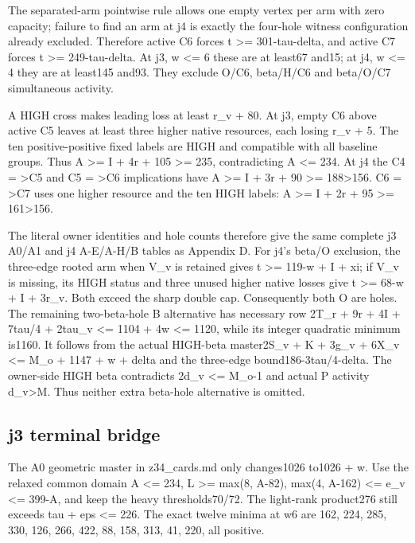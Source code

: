 \documentclass[11pt,a4paper]{article}
\begin{document}
The separated-arm pointwise rule allows one empty vertex per arm with
zero capacity; failure to find an arm at j4 is exactly the four-hole
witness configuration already excluded. Therefore active C6 forces t
\textgreater= 301-tau-delta, and active C7 forces t \textgreater=
249-tau-delta. At j3, w \textless= 6 these are at least67 and15; at j4,
w \textless= 4 they are at least145 and93. They exclude O/C6, beta/H/C6
and beta/O/C7 simultaneous activity.

A HIGH cross makes leading loss at least r\_v + 80. At j3, empty C6
above active C5 leaves at least three higher native resources, each
losing r\_v + 5. The ten positive-positive fixed labels are HIGH and
compatible with all baseline groups. Thus A \textgreater= I + 4r + 105
\textgreater= 235, contradicting A \textless= 234. At j4 the C4 =
\textgreater C5 and C5 = \textgreater C6 implications have A
\textgreater= I + 3r + 90 \textgreater= 188\textgreater156. C6 =
\textgreater C7 uses one higher resource and the ten HIGH labels: A
\textgreater= I + 2r + 95 \textgreater= 161\textgreater156.

The literal owner identities and hole counts therefore give the same
complete j3 A0/A1 and j4 A-E/A-H/B tables as Appendix D. For j4's beta/O
exclusion, the three-edge rooted arm when V\_v is retained gives t
\textgreater= 119-w + I + xi; if V\_v is missing, its HIGH status and
three unused higher native losses give t \textgreater= 68-w + I + 3r\_v.
Both exceed the sharp double cap. Consequently both O are holes. The
remaining two-beta-hole B alternative has necessary row 2T\_r + 9r + 4I
+ 7tau/4 + 2tau\_v \textless= 1104 + 4w \textless= 1120, while its
integer quadratic minimum is1160. It follows from the actual HIGH-beta
master2S\_v + K + 3g\_v + 6X\_v \textless= M\_o + 1147 + w + delta and
the three-edge bound186-3tau/4-delta. The owner-side HIGH beta
contradicts 2d\_v \textless= M\_o-1 and actual P activity
d\_v\textgreater M. Thus neither extra beta-hole alternative is omitted.

\hypertarget{j3-terminal-bridge}{%
\subsection{j3 terminal bridge}\label{j3-terminal-bridge}}

The A0 geometric master in z34\_cards.md only changes1026 to1026 + w.
Use the relaxed common domain A \textless= 234, L \textgreater= max(8,
A-82), max(4, A-162) \textless= e\_v \textless= 399-A, and keep the
heavy thresholds70/72. The light-rank product276 still exceeds tau + eps
\textless= 226. The exact twelve minima at w6 are 162, 224, 285, 330,
126, 266, 422, 88, 158, 313, 41, 220, all positive.
\end{document}

